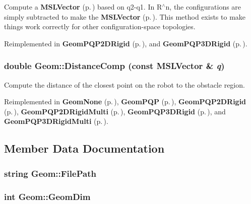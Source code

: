 Compute a {\bf MSLVector} {\rm (p.\,\pageref{class_MSLVector})} based on q2-q1. In R$^\wedge$n, the configurations are simply subtracted to make the {\bf MSLVector} {\rm (p.\,\pageref{class_MSLVector})}. This method exists to make things work correctly for other configuration-space topologies.



Reimplemented in {\bf Geom\-PQP2DRigid} {\rm (p.\,\pageref{class_GeomPQP2DRigid_a4})}, and {\bf Geom\-PQP3DRigid} {\rm (p.\,\pageref{class_GeomPQP3DRigid_a4})}.
\subsubsection{\setlength{\rightskip}{0pt plus 5cm}double Geom::Distance\-Comp (const {\bf MSLVector} \& {\em q})\hspace{0.3cm}{\tt  [pure virtual]}}\label{class_Geom_a3}


Compute the distance of the closest point on the robot to the obstacle region.



Reimplemented in {\bf Geom\-None} {\rm (p.\,\pageref{class_GeomNone_a3})}, {\bf Geom\-PQP} {\rm (p.\,\pageref{class_GeomPQP_a5})}, {\bf Geom\-PQP2DRigid} {\rm (p.\,\pageref{class_GeomPQP2DRigid_a3})}, {\bf Geom\-PQP2DRigid\-Multi} {\rm (p.\,\pageref{class_GeomPQP2DRigidMulti_a3})}, {\bf Geom\-PQP3DRigid} {\rm (p.\,\pageref{class_GeomPQP3DRigid_a3})}, and {\bf Geom\-PQP3DRigid\-Multi} {\rm (p.\,\pageref{class_GeomPQP3DRigidMulti_a3})}.

\subsection{Member Data Documentation}
\subsubsection{\setlength{\rightskip}{0pt plus 5cm}string Geom::File\-Path\hspace{0.3cm}{\tt  [protected]}}\label{class_Geom_n0}


\subsubsection{\setlength{\rightskip}{0pt plus 5cm}int Geom::Geom\-Dim}\label{class_Geom_m1}


